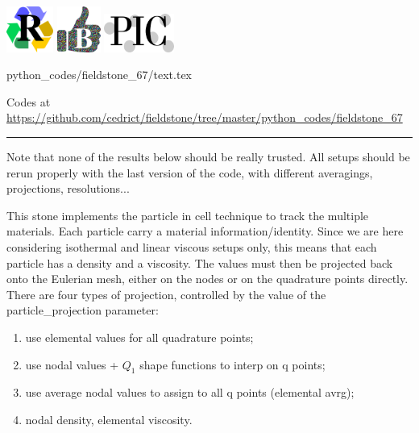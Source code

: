 \includegraphics[height=1.5cm]{images/pictograms/replication}
\includegraphics[height=1.5cm]{images/pictograms/benchmark}
\includegraphics[height=1.25cm]{images/pictograms/pic}

\begin{flushright} {\tiny {\color{gray} python\_codes/fieldstone\_67/text.tex}} \end{flushright}

%

\begin{center}

Codes at \url{https://github.com/cedrict/fieldstone/tree/master/python_codes/fieldstone_67}
\end{center}

\par\noindent\rule{\textwidth}{0.4pt}



Note that none of the results below should be really trusted. All setups should be rerun 
properly with the last version of the code, with different averagings, projections, resolutions...

This stone implements the particle in cell technique to track the multiple materials.
Each particle carry a material information/identity. Since we are here considering 
isothermal and linear viscous setups only, this means that each particle has a density
and a viscosity. The values must then be projected back onto the Eulerian mesh, either 
on the nodes or on the quadrature points directly.
There are four types of projection, controlled by the value of the 
{\python particle\_projection} parameter:
\begin{enumerate}
\item  use elemental values for all quadrature points;
\item  use nodal values + $Q_1$ shape functions to interp on q points;
\item  use average nodal values to assign to all q points (elemental avrg);
\item  nodal density, elemental viscosity.
\end{enumerate}

